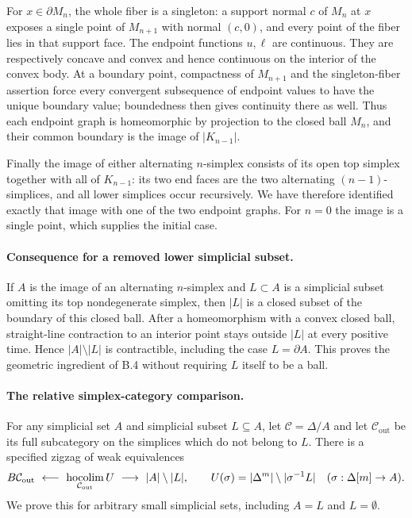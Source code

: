 For $x\in\partial M_n$, the whole fiber is a singleton: a support
normal $c$ of $M_n$ at $x$ exposes a single point of $M_{n+1}$
with normal $(c,0)$, and every point of the fiber lies in that
support face.  The endpoint functions $u,\ell$ are continuous.
They are respectively concave and convex and hence continuous on
the interior of the convex body.  At a boundary point, compactness
of $M_{n+1}$ and the singleton-fiber assertion force every convergent
subsequence of endpoint values to have the unique boundary value;
boundedness then gives continuity there as well.  Thus each endpoint
graph is homeomorphic by projection to the closed ball $M_n$, and
their common boundary is the image of $|K_{n-1}|$.

Finally the image of either alternating $n$-simplex consists of its
open top simplex together with all of $K_{n-1}$: its two end faces
are the two alternating $(n-1)$-simplices, and all lower simplices
occur recursively.  We have therefore identified exactly that image
with one of the two endpoint graphs.  For $n=0$ the image is a
single point, which supplies the initial case.

\paragraph{Consequence for a removed lower simplicial subset.}
If $A$ is the image of an alternating $n$-simplex and $L\subset A$
is a simplicial subset omitting its top nondegenerate simplex, then
$|L|$ is a closed subset of the boundary of this closed ball.
After a homeomorphism with a convex closed ball, straight-line
contraction to an interior point stays outside $|L|$ at every
positive time.  Hence $|A|\setminus|L|$ is contractible, including
the case $L=\partial A$.  This proves the geometric ingredient of
B.4 without requiring $L$ itself to be a ball.

\paragraph{The relative simplex-category comparison.}
For any simplicial set $A$ and simplicial subset $L\subseteq A$,
let $\mathcal C=\Delta/A$ and let $\mathcal C_{\mathrm{out}}$ be
its full subcategory on the simplices which do not belong to $L$.
There is a specified zigzag of weak equivalences
\[
 B\mathcal C_{\mathrm{out}}
 \ \longleftarrow\ \operatorname*{hocolim}_{\mathcal C_{\mathrm{out}}}U
 \ \longrightarrow\ |A|\setminus|L|,
 \qquad
 U(\sigma)=|\Delta^m|\setminus|\sigma^{-1}L|
 \quad(\sigma:\Delta[m]\to A).
\]
We prove this for arbitrary small simplicial sets, including
$A=L$ and $L=\emptyset$.

